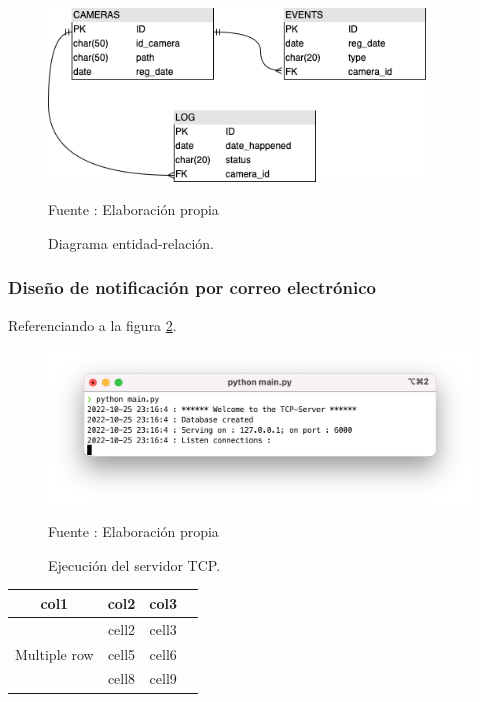 \begin{figure}[H]
    \begin{center}
        \includegraphics[width=10cm]{img/capitulo_4/db.png}
    \end{center}
    \begin{center}
        \caption{Diagrama entidad-relación.}
        Fuente : Elaboración propia
        \label{fig:db_diagram}
    \end{center}
\end{figure}

\subsubsection{Diseño de notificación por correo electrónico}

Referenciando a la figura \ref{fig:servertcp_console}.
\begin{figure}[H]
    \begin{center}
        \includegraphics[width=15cm]{img/capitulo_4/tcp_server.png}
        \caption{Ejecución del servidor TCP.}
        Fuente : Elaboración propia
        \label{fig:servertcp_console}
    \end{center}
\end{figure}

\begin{center}
    \begin{tabular}{ |c|c|c|c| } 
    \hline
    \textbf{col1} & \textbf{col2} & \textbf{col3} \\
    \hline
    \multirow{3}{4em}{Multiple row} & cell2 & cell3 \\ 
    & cell5 & cell6  \\
    & cell8 & cell9 \\ 
    \hline
    \end{tabular}
\end{center}

